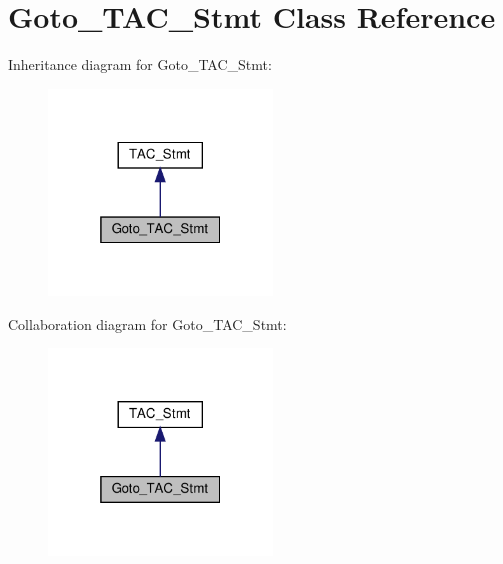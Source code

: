 \hypertarget{classGoto__TAC__Stmt}{}\section{Goto\+\_\+\+T\+A\+C\+\_\+\+Stmt Class Reference}
\label{classGoto__TAC__Stmt}


Inheritance diagram for Goto\+\_\+\+T\+A\+C\+\_\+\+Stmt\+:
\nopagebreak
\begin{figure}[H]
\begin{center}
\leavevmode
\includegraphics[width=169pt]{classGoto__TAC__Stmt__inherit__graph}
\end{center}
\end{figure}


Collaboration diagram for Goto\+\_\+\+T\+A\+C\+\_\+\+Stmt\+:
\nopagebreak
\begin{figure}[H]
\begin{center}
\leavevmode
\includegraphics[width=169pt]{classGoto__TAC__Stmt__coll__graph}
\end{center}
\end{figure}

